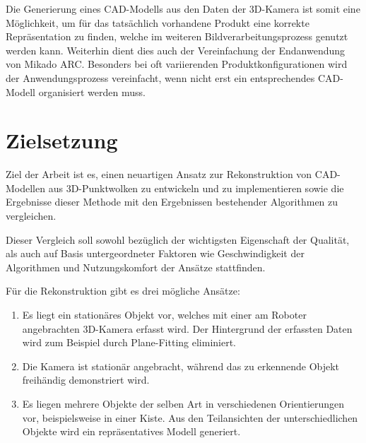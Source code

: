 Die Generierung eines CAD-Modells aus den Daten der 3D-Kamera ist somit eine Möglichkeit, um für das tatsächlich vorhandene Produkt eine korrekte Repräsentation zu finden, welche im weiteren Bildverarbeitungsprozess genutzt werden kann.
Weiterhin dient dies auch der Vereinfachung der Endanwendung von Mikado ARC.
Besonders bei oft variierenden Produktkonfigurationen wird der Anwendungsprozess vereinfacht, wenn nicht erst ein entsprechendes CAD-Modell organisiert werden muss.


\section{Zielsetzung}
\label{sec:ziel}

Ziel der Arbeit ist es, einen neuartigen Ansatz zur Rekonstruktion von CAD-Modellen aus 3D-Punktwolken zu entwickeln und zu implementieren sowie die Ergebnisse dieser Methode mit den Ergebnissen bestehender Algorithmen zu vergleichen.

Dieser Vergleich soll sowohl bezüglich der wichtigsten Eigenschaft der Qualität, als auch auf Basis untergeordneter Faktoren wie Geschwindigkeit der Algorithmen und Nutzungskomfort der Ansätze stattfinden.

Für die Rekonstruktion gibt es drei mögliche Ansätze:

\begin{enumerate}
\item Es liegt ein stationäres Objekt vor, welches mit einer am Roboter angebrachten 3D-Kamera erfasst wird.
Der Hintergrund der erfassten Daten wird zum Beispiel durch Plane-Fitting \cite{schomaker1959fit} eliminiert.

\item Die Kamera ist stationär angebracht, während das zu erkennende Objekt freihändig demonstriert wird.

\item Es liegen mehrere Objekte der selben Art in verschiedenen Orientierungen vor, beispielsweise in einer Kiste.
Aus den Teilansichten der unterschiedlichen Objekte wird ein repräsentatives Modell generiert.
\end{enumerate}
